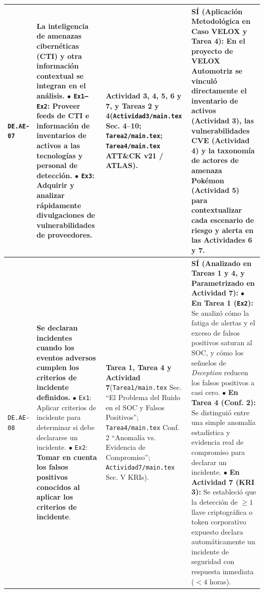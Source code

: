 \documentclass[letterpaper,11pt]{article}
\begin{document}
\begin{longtable}{|C{1.5cm}|L{5.3cm}|L{4.3cm}|L{5.8cm}|}
\texttt{DE.AE-07} &
\textbf{La inteligencia de amenazas cibernéticas (CTI) y otra información contextual se integran en el análisis.}\newline
$\bullet$ \texttt{Ex1--Ex2}: Proveer feeds de CTI e información de inventarios de activos a las tecnologías y personal de detección.\newline
$\bullet$ \texttt{Ex3}: Adquirir y analizar rápidamente divulgaciones de vulnerabilidades de proveedores. &
\textbf{Actividad 3, 4, 5, 6 y 7, y Tareas 2 y 4}\newline (\texttt{Actividad3/main.tex} Sec. 4--10; \texttt{Tarea2/main.tex}; \texttt{Tarea4/main.tex} ATT\&CK v21 / ATLAS). &
\textbf{SÍ (Aplicación Metodológica en Caso VELOX y Tarea 4):}\newline
En el proyecto de VELOX Automotriz se vinculó directamente el inventario de activos (Actividad 3), las vulnerabilidades CVE (Actividad 4) y la taxonomía de actores de amenaza Pokémon (Actividad 5) para contextualizar cada escenario de riesgo y alerta en las Actividades 6 y 7. \\
\hline

\texttt{DE.AE-08} &
\textbf{Se declaran incidentes cuando los eventos adversos cumplen los criterios de incidente definidos.}\newline
$\bullet$ \texttt{Ex1}: Aplicar criterios de incidente para determinar si debe declararse un incidente.\newline
$\bullet$ \texttt{Ex2}: \textbf{Tomar en cuenta los falsos positivos conocidos al aplicar los criterios de incidente}. &
\textbf{Tarea 1, Tarea 4 y Actividad 7}\newline (\texttt{Tarea1/main.tex} Sec. ``El Problema del Ruido en el SOC y Falsos Positivos''; \texttt{Tarea4/main.tex} Conf. 2 ``Anomalía vs. Evidencia de Compromiso''; \texttt{Actividad7/main.tex} Sec. V KRIs). &
\textbf{SÍ (Analizado en Tareas 1 y 4, y Parametrizado en Actividad 7):}\newline
$\bullet$ \textbf{En Tarea 1 (\texttt{Ex2}):} Se analizó cómo la fatiga de alertas y el exceso de falsos positivos saturan al SOC, y cómo los señuelos de \textit{Deception} reducen los falsos positivos a casi cero.\newline
$\bullet$ \textbf{En Tarea 4 (Conf. 2):} Se distinguió entre una simple anomalía estadística y evidencia real de compromiso para declarar un incidente.\newline
$\bullet$ \textbf{En Actividad 7 (KRI 3):} Se estableció que la detección de $\ge 1$ llave criptográfica o token corporativo expuesto declara automáticamente un incidente de seguridad con respuesta inmediata ($<4$ horas). \\
\hline
\end{longtable}
\endgroup
\end{document}
